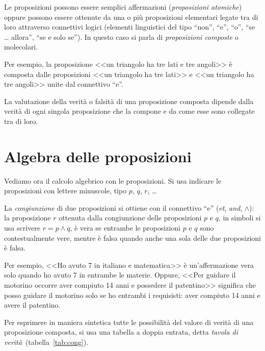 Le proposizioni possono essere semplici affermazioni (\emph{proposizioni atomiche}) oppure possono essere ottenute da una o più proposizioni elementari legate tra di loro attraverso connettivi logici (elementi linguistici del tipo ``non'', ``e'', ``o'', ``se \ldots{} allora'', ``se e solo se''). In questo caso si parla di \emph{proposizioni composte} o molecolari.

Per esempio, la proposizione <<un triangolo ha tre lati e tre angoli>> è composta dalle proposizioni <<un triangolo ha tre lati>> e <<un triangolo ha tre angoli>> unite dal connettivo ``e''.

La valutazione della verità o falsità di una proposizione composta dipende dalla verità di ogni singola proposizione che la compone e da come esse sono collegate tra di loro.

\vspazio\ovalbox{\risolvi \ref{ese:6.1}}

\section{Algebra delle proposizioni}

Vediamo ora il calcolo algebrico con le proposizioni. Si usa indicare le proposizioni con lettere minuscole, tipo $p$, $q$, $r$, \ldots

La \emph{congiunzione} di due proposizioni si ottiene con il connettivo ``e'' (\emph{et}, \emph{and}, $\wedge$): la proposizione $r$ ottenuta dalla congiunzione delle proposizioni $p$ e $q$, in simboli si usa scrivere $r=p\wedge q$, è vera se entrambe le proposizioni $p$ e $q$ sono contestualmente vere, mentre è falsa quando anche una sola delle due proposizioni è falsa.

Per esempio, <<Ho avuto 7 in italiano e matematica>> è un'affermazione vera solo quando ho avuto 7 in entrambe le materie. Oppure, <<Per guidare il motorino occorre aver compiuto 14 anni e possedere il patentino>> significa che posso guidare il motorino solo se ho entrambi i requisisti: aver compiuto 14 anni e avere il patentino.

Per esprimere in maniera sintetica tutte le possibilità del valore di verità di una proposizione composta, si usa una tabella a doppia entrata, detta \emph{tavola di verità}~(tabella~\ref{tab:cong}). %


